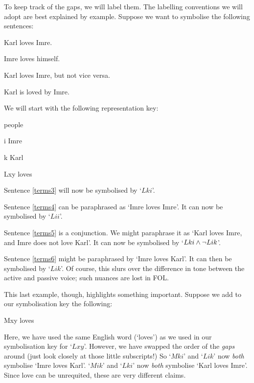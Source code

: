 To keep track of the gaps, we will label them. The labelling conventions we will adopt are best explained by example. Suppose we want to symbolise the following sentences:
	\begin{earg}
		\item[\ex{terms3}] Karl loves Imre.
		\item[\ex{terms4}] Imre loves himself.
		\item[\ex{terms5}] Karl loves Imre, but not vice versa.
		\item[\ex{terms6}] Karl is loved by Imre.
	\end{earg}
We will start with the following representation key:
	\begin{ekey}
		\item[\text{domain}] people
		\item[i] Imre
		\item[k] Karl
		\item[Lxy]  loves 
	\end{ekey}
Sentence \ref{terms3} will now be symbolised by `$Lki$'. 

Sentence \ref{terms4} can be paraphrased as `Imre loves Imre'. It can now be symbolised by `$Lii$'. 

Sentence \ref{terms5} is a conjunction. We might paraphrase it as `Karl loves Imre, and Imre does not love Karl'. It can now be symbolised by `$Lki \wedge \neg Lik$'. 

Sentence \ref{terms6} might be paraphrased by `Imre loves Karl'. It can then be symbolised by `$Lik$'. Of course, this slurs over the difference in tone between the active and passive voice; such nuances are lost in FOL. 

This last example, though, highlights something important. Suppose we add to our symbolisation key the following:
	\begin{ekey}
		\item[Mxy]  loves \gap{x}
	\end{ekey}
Here, we have used the same English word (`loves') as we used in our symbolisation key for `$Lxy$'. However, we have swapped the order of the \emph{gaps} around (just look closely at those little subscripts!) So `$Mki$' and `$Lik$' now \emph{both} symbolise `Imre loves Karl'. `$Mik$' and `$Lki$' now \emph{both} symbolise `Karl loves Imre'. Since love can be unrequited, these are very different claims. 

